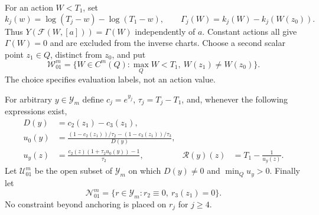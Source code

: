 For an action $W<T_1$, set
\begin{equation}\label{eq:v79-model-chart}
 k_j(w)=\log(T_j-w)-\log(T_1-w),\qquad
 \Gamma_j(W)=k_j(W)-k_j(W(z_0)).
\end{equation}
Thus $Y(\mathcal F(W,[a]))=\Gamma(W)$ independently of $a$.
Constant actions all give $\Gamma(W)=0$ and are excluded from the
inverse charts.  Choose a second scalar point $z_1\in Q$, distinct
from $z_0$, and put
\[
 \mathcal W_{01}^m
   =\{W\in C^m(Q):\max_Q W<T_1,\ W(z_1)\ne W(z_0)\}.
\]
The choice specifies evaluation labels, not an action value.

For arbitrary $y\in\mathcal Y_m$ define $c_j=e^{y_j}$,
$\tau_j=T_j-T_1$, and, whenever the following expressions exist,
\begin{align}
 D(y)&=c_2(z_1)-c_3(z_1),\label{eq:v79-inverse-D}\\
 u_0(y)&=\frac{(1-c_2(z_1))/\tau_2-(1-c_3(z_1))/\tau_3}{D(y)},
       \label{eq:v79-inverse-u0}\\
 u_y(z)&=\frac{c_2(z)(1+\tau_2u_0(y))-1}{\tau_2},
       &\mathcal R(y)(z)&=T_1-\frac1{u_y(z)}.
       \label{eq:v79-inverse-u}
\end{align}
Let $\mathcal U_{01}^m$ be the open subset of $\mathcal Y_m$ on which
$D(y)\ne0$ and $\min_Q u_y>0$.  Finally let
\begin{equation}\label{eq:v79-normal-space}
 \mathcal N_{01}^m
   =\{r\in\mathcal Y_m:r_2\equiv0,\ r_3(z_1)=0\}.
\end{equation}
No constraint beyond anchoring is placed on $r_j$ for $j\ge4$.

